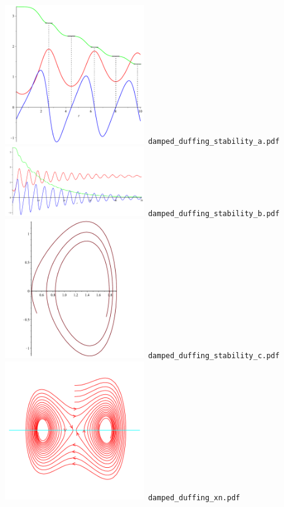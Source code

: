 \documentclass[a4paper]{amsart}
\begin{document}
\includegraphics[width=6cm]{damped_duffing_stability_a.pdf}\verb+ damped_duffing_stability_a.pdf+\\
\includegraphics[width=6cm]{damped_duffing_stability_b.pdf}\verb+ damped_duffing_stability_b.pdf+\\
\includegraphics[width=6cm]{damped_duffing_stability_c.pdf}\verb+ damped_duffing_stability_c.pdf+\\
\includegraphics[width=6cm]{damped_duffing_xn.pdf}\verb+ damped_duffing_xn.pdf+\\
\end{document}
